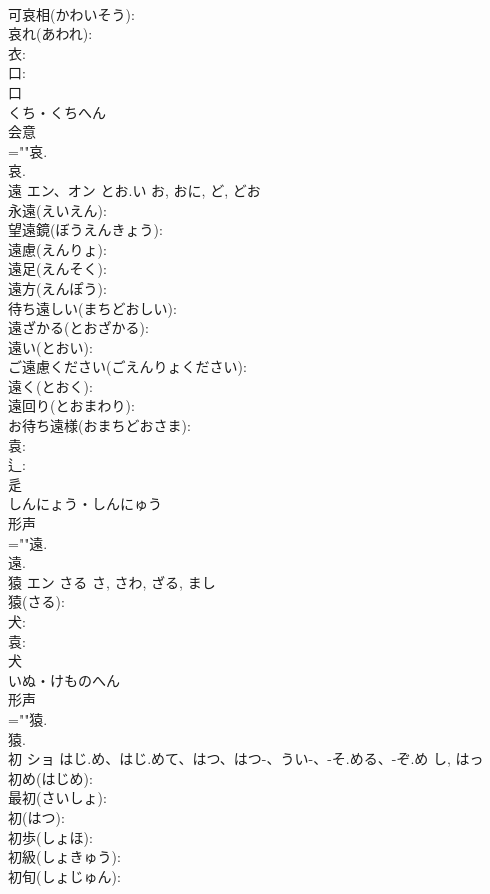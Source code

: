 \documentclass[8pt]{extreport}
\begin{document}
\begin{CJK}{UTF8}{min}
\\	可哀相(かわいそう): 
\\	哀れ(あわれ): 
\\	衣: 
\\	口: 
\\	口	
\\	くち・くちへん	
\\	会意 
\\	=""哀.
\\	哀.
\\	遠	エン、オン	とお.い	お, おに, ど, どお	
\\	永遠(えいえん): 
\\	望遠鏡(ぼうえんきょう): 
\\	遠慮(えんりょ): 
\\	遠足(えんそく): 
\\	遠方(えんぽう): 
\\	待ち遠しい(まちどおしい): 
\\	遠ざかる(とおざかる): 
\\	遠い(とおい): 
\\	ご遠慮ください(ごえんりょください): 
\\	遠く(とおく): 
\\	遠回り(とおまわり): 
\\	お待ち遠様(おまちどおさま): 
\\	袁: 
\\	辶: 
\\	辵	
\\	しんにょう・しんにゅう	
\\	形声 
\\	=""遠.
\\	遠.
\\	猿	エン	さる	さ, さわ, ざる, まし	
\\	猿(さる): 
\\	犬: 
\\	袁: 
\\	犬	
\\	いぬ・けものへん	
\\	形声 
\\	=""猿.
\\	猿.
\\	初	ショ	はじ.め、はじ.めて、はつ、はつ-、うい-、-そ.める、-ぞ.め	し, はっ	
\\	初め(はじめ): 
\\	最初(さいしょ): 
\\	初(はつ): 
\\	初歩(しょほ): 
\\	初級(しょきゅう): 
\\	初旬(しょじゅん): 

\end{CJK}
\end{document}
